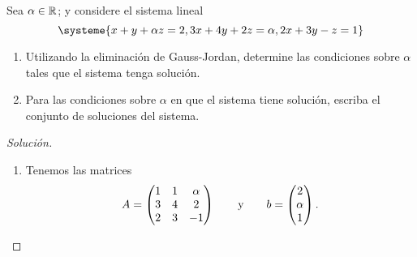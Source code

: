 \documentclass[a4,11pt]{aleph-notas}
\begin{document}
\begin{ejer}
    Sea $\alpha \in \mathbb{R}$; y considere el sistema lineal
    \[
        \systeme{x+y+\alpha z=2, 3x+4y+2z=\alpha, 2x+3y-z=1}
    \]
    \begin{enumerate}
        \item Utilizando la eliminación de Gauss-Jordan, determine las condiciones sobre $\alpha$ tales que el sistema tenga solución.
        \item Para las condiciones sobre $\alpha$ en que el sistema tiene solución, escriba el conjunto de soluciones del sistema.
    \end{enumerate}
\end{ejer}

\begin{proof}[Solución]\hspace{0pt}
    \begin{enumerate}
    \item 
        Tenemos las matrices
        \[
            A = \begin{pmatrix}
            1&1&\alpha\\3&4&2\\2&3&-1
            \end{pmatrix}
            \qquad\text{y}\qquad
            b = \begin{pmatrix}
            2 \\ \alpha\\ 1
            \end{pmatrix}.
        \]


\end{enumerate}
\end{proof}
\end{document}
